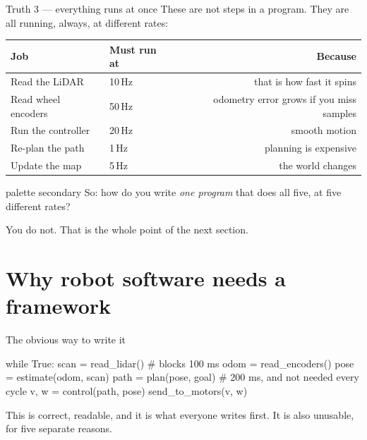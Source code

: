 \documentclass[aspectratio=169]{beamer}
\begin{document}
\begin{frame}{Truth 3 --- everything runs at once}
  \small
  These are not steps in a program. They are all running, always, at different rates:

  \vspace{0.5em}
  \begin{center}
  \begin{tabular}{@{}llr@{}}
    \toprule
    \textbf{Job} & \textbf{Must run at} & \textbf{Because} \\
    \midrule
    Read the LiDAR       & 10\,Hz  & that is how fast it spins \\
    Read wheel encoders  & 50\,Hz  & odometry error grows if you miss samples \\
    Run the controller   & 20\,Hz  & smooth motion \\
    Re-plan the path     & 1\,Hz   & planning is expensive \\
    Update the map       & 5\,Hz   & the world changes \\
    \bottomrule
  \end{tabular}
  \end{center}

  \vspace{0.7em}
  \centering
  \begin{beamercolorbox}[sep=6pt,center,rounded=true]{palette secondary}
    \small So: how do you write \emph{one program} that does all five, at five different rates?
  \end{beamercolorbox}

  \vspace{0.3em}
  \centering \small You do not. That is the whole point of the next section.
\end{frame}

\section{Why robot software needs a framework}

\begin{frame}[fragile]{The obvious way to write it}
  \begin{pycodes}
while True:
    scan  = read_lidar()          # blocks 100 ms
    odom  = read_encoders()
    pose  = estimate(odom, scan)
    path  = plan(pose, goal)      # 200 ms, and not needed every cycle
    v, w  = control(path, pose)
    send_to_motors(v, w)
  \end{pycodes}

  \vspace{0.5em}
  \small This is correct, readable, and it is what everyone writes first.
  It is also unusable, for five separate reasons.
\end{frame}
\end{document}
